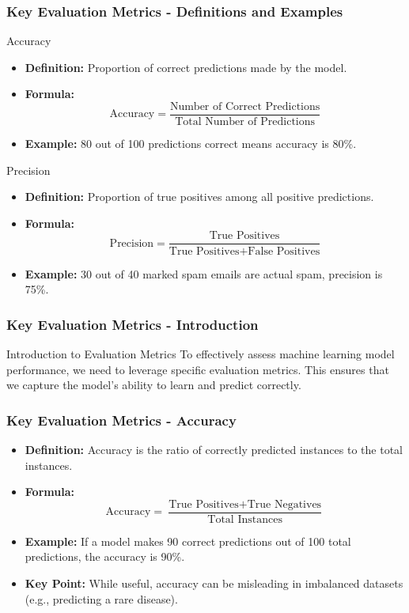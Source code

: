 \documentclass[aspectratio=169]{beamer}
\begin{document}
\begin{frame}[fragile]
    \frametitle{Key Evaluation Metrics - Definitions and Examples}
    \begin{block}{Accuracy}
        \begin{itemize}
            \item \textbf{Definition:} Proportion of correct predictions made by the model.
            \item \textbf{Formula:} 
            \[
            \text{Accuracy} = \frac{\text{Number of Correct Predictions}}{\text{Total Number of Predictions}}
            \]
            \item \textbf{Example:} 80 out of 100 predictions correct means accuracy is 80\%.
        \end{itemize}
    \end{block}
    \begin{block}{Precision}
        \begin{itemize}
            \item \textbf{Definition:} Proportion of true positives among all positive predictions.
            \item \textbf{Formula:}
            \[
            \text{Precision} = \frac{\text{True Positives}}{\text{True Positives} + \text{False Positives}}
            \]
            \item \textbf{Example:} 30 out of 40 marked spam emails are actual spam, precision is 75\%.
        \end{itemize}
    \end{block}
\end{frame}

\begin{frame}[fragile]
    \frametitle{Key Evaluation Metrics - Introduction}
    \begin{block}{Introduction to Evaluation Metrics}
        To effectively assess machine learning model performance, we need to leverage specific evaluation metrics. This ensures that we capture the model’s ability to learn and predict correctly.
    \end{block}
\end{frame}

\begin{frame}[fragile]
    \frametitle{Key Evaluation Metrics - Accuracy}
    \begin{itemize}
        \item \textbf{Definition:} Accuracy is the ratio of correctly predicted instances to the total instances.
        \item \textbf{Formula:}  
        \begin{equation}
            \text{Accuracy} = \frac{\text{True Positives} + \text{True Negatives}}{\text{Total Instances}}
        \end{equation}
        \item \textbf{Example:} If a model makes 90 correct predictions out of 100 total predictions, the accuracy is 90\%.
        \item \textbf{Key Point:} While useful, accuracy can be misleading in imbalanced datasets (e.g., predicting a rare disease).
    \end{itemize}
\end{frame}
\end{document}

